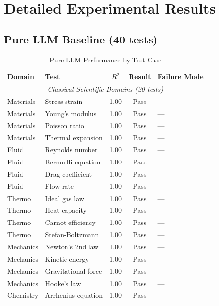 \documentclass[twoside,11pt]{article}
\begin{document}
\section{Detailed Experimental Results}
\label{app:detailed_results}

\subsection{Pure LLM Baseline (40 tests)}\citep{kambhampati2024llms}

\begin{table}[H]
\centering
\caption{Pure LLM Performance by Test Case}
\label{tab:llm_detailed}
\begin{small}
\begin{tabular}{@{}llccp{4.5cm}@{}}
\toprule
\textbf{Domain} & \textbf{Test} & \textbf{$R^2$} & \textbf{Result} & \textbf{Failure Mode} \\
\midrule
\multicolumn{5}{c}{\textit{Classical Scientific Domains (20 tests)}} \\\citep{virtanen2020scipy}
\midrule
Materials & Stress-strain & 1.00 & Pass & --- \\
Materials & Young's modulus & 1.00 & Pass & --- \\
Materials & Poisson ratio & 1.00 & Pass & --- \\
Materials & Thermal expansion & 1.00 & Pass & --- \\
Fluid & Reynolds number & 1.00 & Pass & --- \\
Fluid & Bernoulli equation & 1.00 & Pass & --- \\
Fluid & Drag coefficient & 1.00 & Pass & --- \\
Fluid & Flow rate & 1.00 & Pass & --- \\
Thermo & Ideal gas law & 1.00 & Pass & --- \\
Thermo & Heat capacity & 1.00 & Pass & --- \\
Thermo & Carnot efficiency & 1.00 & Pass & --- \\
Thermo & Stefan-Boltzmann & 1.00 & Pass & --- \\
Mechanics & Newton's 2nd law & 1.00 & Pass & --- \\
Mechanics & Kinetic energy & 1.00 & Pass & --- \\
Mechanics & Gravitational force & 1.00 & Pass & --- \\
Mechanics & Hooke's law & 1.00 & Pass & --- \\
Chemistry & Arrhenius equation & 1.00 & Pass & --- \\

\end{tabular}
\end{small}
\end{table}
\end{document}
